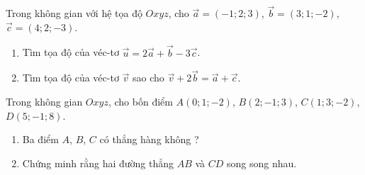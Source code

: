 \begin{bt}%
	Trong không gian với hệ tọa độ $Oxyz$, cho $\overrightarrow{a}=(-1;2;3)$, $\overrightarrow{b}=(3;1;-2)$, $\overrightarrow{c}=(4;2;-3)$.
	\begin{enumerate}
		\item Tìm tọa độ của véc-tơ $\overrightarrow{u}=2\overrightarrow{a}+\overrightarrow{b}-3\overrightarrow{c}$.
		\item Tìm tọa độ của véc-tơ $\overrightarrow{v}$ sao cho $\overrightarrow{v}+2\overrightarrow{b}=\overrightarrow{a}+\overrightarrow{c}$.
	\end{enumerate}
\end{bt}

\begin{bt}%
	Trong không gian $Oxyz$, cho bốn điểm $A(0;1;-2)$, $B(2;-1;3)$, $C(1;3;-2)$, $D(5;-1;8)$.
	\begin{enumerate}
		\item Ba điểm $A$, $B$, $C$ có thẳng hàng không ?
		\item Chứng minh rằng hai đường thẳng $AB$ và $CD$ song song nhau.
	\end{enumerate}
\end{bt}

